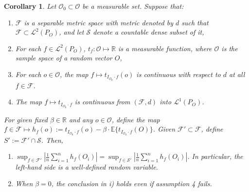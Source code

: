 \documentclass[twoside,11pt]{article}
\newtheorem{corollary}{Corollary}
\newcommand{\E}{\mathbb{E}}
\newcommand{\mc}{\mathcal}
\begin{document}
\begin{corollary}
Let $\mc{O}_0\subset\mc{O}$ be a measurable set. Suppose that:
\begin{enumerate}
    \item $\mc{F}$ is a separable metric space with metric denoted by $d$ such that $\mc{F}\subset\mc{L}^2(P_O)$, and let $\mc{S}$ denote a countable dense subset of it,
    \item For each $f\in\mc{L}^2(P_O)$, $t_f:\mc{O}\mapsto\mathbb{R}$ is a measurable function,  where $\mc{O}$ is the sample space of a random vector $O$,
    \item For each $o\in\mc{O}$, the map $f\mapsto t_{I_{\mc{O}_0}\cdot f}(o)$ is continuous with respect to $d$ at all $f \in \mc{F}$.
    \item The map $f\mapsto t_{I_{\mc{O}_0}\cdot f}$ is continuous from $(\mc{F},d)$ into $\mc{L}^1(P_O)$.
\end{enumerate}
For given fixed $\beta\in\mathbb{R}$ and any $o\in\mc{O}$, define the map $f\in\mc{F}\mapsto h_f(o):= t_{I_{\mc{O}_0}\cdot f}(o)-\beta\cdot\E\{t_{I_{\mc{O}_0}\cdot f}(O)\}$. Given $\mc{F}'\subset\mc{F}$, define $S':=\mc{F}'\cap\mc{S}$. Then,
\begin{enumerate}
    \item[i)] $\sup_{f\in \mc{F}'}\left\vert \frac{1}{n}\sum_{i=1}^nh_f(O_i) \right\vert
= \sup_{f \in \mc{S}'}\left\vert \frac{1}{n}\sum_{i=1}^nh_f(O_i) \right\vert$. In particular, the left-hand side is a well-defined random variable.
\item[ii)] When $\beta=0$, the conclusion in i) holds even if assumption 4 fails.
\end{enumerate}
 \label{corollary:countable_Lf}
\end{corollary}
\end{document}
